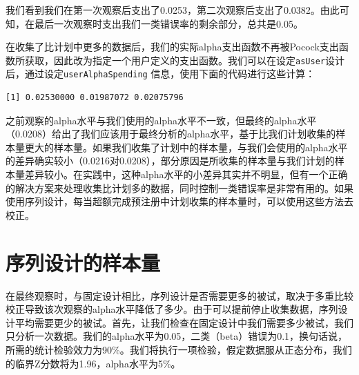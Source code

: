 \documentclass[
  letterpaper,
  DIV=11,
  numbers=noendperiod]{scrreprt}
\newenvironment{Shaded}{\begin{snugshade}}{\end{snugshade}}
\newcommand{\AttributeTok}[1]{\textcolor[rgb]{0.40,0.45,0.13}{#1}}
\newcommand{\DecValTok}[1]{\textcolor[rgb]{0.68,0.00,0.00}{#1}}
\newcommand{\FloatTok}[1]{\textcolor[rgb]{0.68,0.00,0.00}{#1}}
\newcommand{\FunctionTok}[1]{\textcolor[rgb]{0.28,0.35,0.67}{#1}}
\newcommand{\NormalTok}[1]{\textcolor[rgb]{0.00,0.23,0.31}{#1}}
\newcommand{\OtherTok}[1]{\textcolor[rgb]{0.00,0.23,0.31}{#1}}
\newcommand{\SpecialCharTok}[1]{\textcolor[rgb]{0.37,0.37,0.37}{#1}}
\newcommand{\StringTok}[1]{\textcolor[rgb]{0.13,0.47,0.30}{#1}}
\begin{document}
我们看到我们在第一次观察后支出了0.0253，第二次观察后支出了0.0382。由此可知，在最后一次观察时支出我们一类错误率的剩余部分，总共是0.05。

在收集了比计划中更多的数据后，我们的实际alpha支出函数不再被Pocock支出函数所获取，因此改为指定一个用户定义的支出函数。我们可以在设定\texttt{asUser}设计后，通过设定\texttt{userAlphaSpending}
信息，使用下面的代码进行这些计算：

\begin{Shaded}
\end{Shaded}

\begin{verbatim}
[1] 0.02530000 0.01987072 0.02075796
\end{verbatim}

之前观察的alpha水平与我们使用的alpha水平不一致，但最终的alpha水平（0.0208）给出了我们应该用于最终分析的alpha水平，基于比我们计划收集的样本量更大的样本量。如果我们收集了计划中的样本量，与我们会使用的alpha水平的差异确实较小（0.0216对0.0208），部分原因是所收集的样本量与我们计划的样本量差异较小。在实践中，这种alpha水平的小差异其实并不明显，但有一个正确的解决方案来处理收集比计划多的数据，同时控制一类错误率是非常有用的。如果使用序列设计，每当超额完成预注册中计划收集的样本量时，可以使用这些方法去校正。

\hypertarget{ux5e8fux5217ux8bbeux8ba1ux7684ux6837ux672cux91cf}{%
\section{序列设计的样本量}\label{ux5e8fux5217ux8bbeux8ba1ux7684ux6837ux672cux91cf}}

在最终观察时，与固定设计相比，序列设计是否需要更多的被试，取决于多重比较校正导致该次观察的alpha水平降低了多少。由于可以提前停止收集数据，序列设计平均需要更少的被试。首先，让我们检查在固定设计中我们需要多少被试，我们只分析一次数据。我们的alpha水平为0.05，二类（beta）错误为0.1，换句话说，所需的统计检验效力为90\%。我们将执行一项检验，假定数据服从正态分布，我们的临界Z分数将为1.96，alpha水平为5\%。
\end{document}
